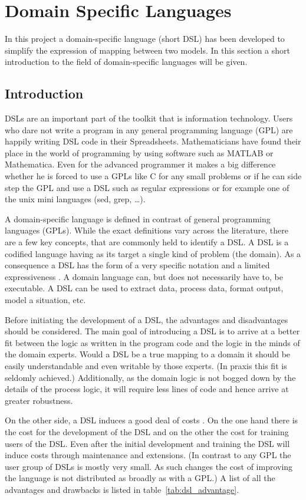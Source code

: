 \documentclass{scrartcl}
\begin{document}
\section{Domain Specific Languages}
\label{sec:domain_specific_languages}
In this project a domain-specific language (short DSL) has been developed to
simplify the expression of mapping between two models. In this section a short
introduction to the field of domain-specific languages will be given.

\subsection{Introduction}
\label{sub:introduction}
DSLs are an important part of the toolkit that is information technology. Users
who dare not write a program in any general programming language (GPL) are
happily writing DSL code in their Spreadsheets. Mathematicians have found their
place in the world of programming by using software such as MATLAB or
Mathematica\@. Even for the advanced programmer it makes a big difference
whether he is forced to use a GPLs like C for any small problems or if he can
side step the GPL and use a DSL such as regular expressions or for example one
of the unix mini languages (sed, grep, \ldots).

A domain-specific language is defined in contrast of general programming
languages (GPLs). While the exact definitions vary across the literature, there
are a few key concepts, that are commonly held to identify a DSL\@. A DSL is a
codified language having as its target a single kind of problem (the domain).
As a consequence a DSL has the form of a very specific notation and a limited
expressiveness \cite{website:dsl}. A domain language can, but does not
necessarily have to,  be executable. A DSL can be used to extract data, process
data, format output, model a situation, etc.

Before initiating the development of a DSL, the advantages and disadvantages
should be considered. The main goal of introducing a DSL is to arrive at a
better fit between the logic as written in the program code and the logic in
the minds of the domain experts. Would a DSL be a true mapping to a domain it
should be easily understandable and even writable by those experts. (In praxis
this fit is seldomly achieved.) Additionally, as the domain logic is not bogged
down by the details of the process logic, it will require less lines of code
and hence arrive at greater robustness.

On the other side, a DSL induces a good deal of costs
\cite{kosar2008preliminary}. On the one hand there is the cost for the
development of the DSL and on the other the cost for training users of the
DSL\@. Even after the initial development and training the DSL will induce
costs through maintenance and extensions. (In contrast to any GPL the user
group of DSLs is mostly very small. As such changes the cost of improving the
language is not distributed as broadly as with a GPL.) A list of all the
advantages and drawbacks is listed in table~\ref{tab:dsl_advantage}.
\end{document}
